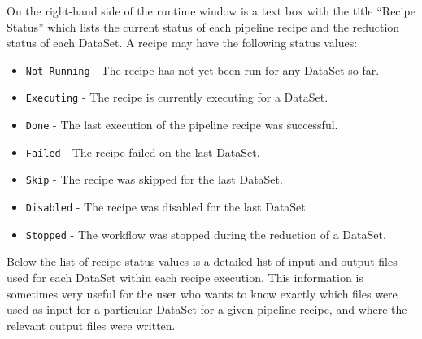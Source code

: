 On the right-hand side of the runtime window is a text box with the
title ``Recipe Status'' which lists the current status of each
pipeline recipe and the reduction status of each DataSet. A recipe may
have the following status values:
\begin{itemize}
\item{{\tt Not Running} - The recipe has not yet been run for any DataSet so far.}
\item{{\tt Executing} - The recipe is currently executing for a DataSet.}
\item{{\tt Done} - The last execution of the pipeline recipe was successful.}
\item{{\tt Failed} - The recipe failed on the last DataSet.}
\item{{\tt Skip} - The recipe was skipped for the last DataSet.}
\item{{\tt Disabled} - The recipe was disabled for the last DataSet.}
\item{{\tt Stopped} - The workflow was stopped during the reduction of a DataSet.}
\end{itemize}

Below the list of recipe status values is a detailed list of input and
output files used for each DataSet within each recipe execution. This
information is sometimes very useful for the user who wants to know
exactly which files were used as input for a particular DataSet for a
given pipeline recipe, and where the relevant output files were
written.
